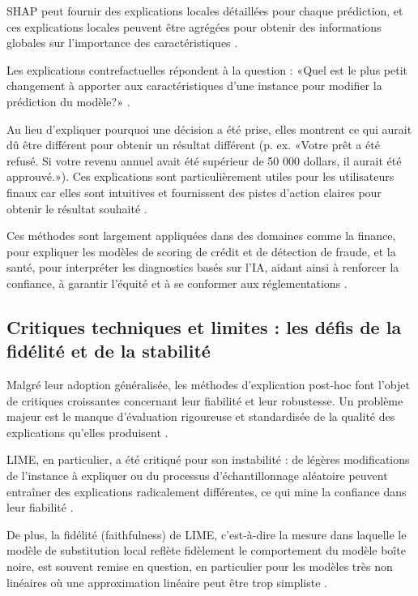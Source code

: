 SHAP peut fournir des explications locales détaillées pour chaque prédiction, et ces explications locales peuvent être agrégées pour obtenir des informations globales sur l'importance des caractéristiques \citep{Siganos2019Explaining}.

Les explications contrefactuelles répondent à la question : «Quel est le plus petit changement à apporter aux caractéristiques d'une instance pour modifier la prédiction du modèle?» \citet{Wachter2017Counterfactual}.

Au lieu d'expliquer pourquoi une décision a été prise, elles montrent ce qui aurait dû être différent pour obtenir un résultat différent (p. ex. «Votre prêt a été refusé. Si votre revenu annuel avait été supérieur de 50 000 dollars, il aurait été approuvé.»). Ces explications sont particulièrement utiles pour les utilisateurs finaux car elles sont intuitives et fournissent des pistes d'action claires pour obtenir le résultat souhaité \citep{Verma2024Counterfactual}.

Ces méthodes sont largement appliquées dans des domaines comme la finance, pour expliquer les modèles de scoring de crédit et de détection de fraude, et la santé, pour interpréter les diagnostics basés sur l'IA, aidant ainsi à renforcer la confiance, à garantir l'équité et à se conformer aux réglementations \citep{Bussmann2021Explainable, Misheva2025Explainable}.
\subsection{Critiques techniques et limites : les défis de la fidélité et de la stabilité}
Malgré leur adoption généralisée, les méthodes d'explication post-hoc font l'objet de critiques croissantes concernant leur fiabilité et leur robustesse. Un problème majeur est le manque d'évaluation rigoureuse et standardisée de la qualité des explications qu'elles produisent \citep{Sankarapu2022A, Räuker2023}.

LIME, en particulier, a été critiqué pour son instabilité : de légères modifications de l'instance à expliquer ou du processus d'échantillonnage aléatoire peuvent entraîner des explications radicalement différentes, ce qui mine la confiance dans leur fiabilité \citep{Alvarez-Melis2021On, Visani2023A}.

De plus, la fidélité (faithfulness) de LIME, c'est-à-dire la mesure dans laquelle le modèle de substitution local reflète fidèlement le comportement du modèle boîte noire, est souvent remise en question, en particulier pour les modèles très non linéaires où une approximation linéaire peut être trop simpliste \citep{Rudin2019, Plumb2022Model}.


